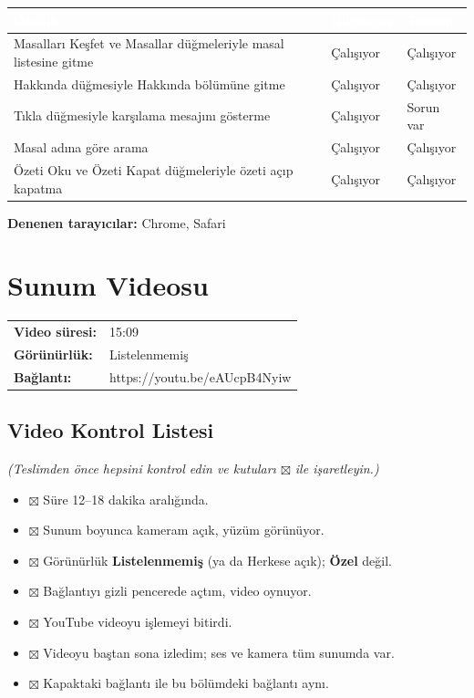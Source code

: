 \documentclass[12pt,a4paper]{article}
\newcommand{\aciklama}[1]{{\color{gray}\itshape (#1)}}
\begin{document}
\begin{center}
\begin{tabular}{@{}p{6cm}p{3.4cm}p{3.4cm}@{}}
\toprule
\rowcolor{ana}\textcolor{white}{\textbf{Özellik}} & \textcolor{white}{\textbf{Bilgisayar}} & \textcolor{white}{\textbf{Telefon}} \\
\midrule
\relax Masalları Keşfet ve Masallar düğmeleriyle masal listesine gitme & Çalışıyor & Çalışıyor \\
\relax Hakkında düğmesiyle Hakkında bölümüne gitme & Çalışıyor & Çalışıyor \\
\relax Tıkla düğmesiyle karşılama mesajını gösterme & Çalışıyor & Sorun var \\
\relax Masal adına göre arama & Çalışıyor & Çalışıyor \\
\relax Özeti Oku ve Özeti Kapat düğmeleriyle özeti açıp kapatma & Çalışıyor & Çalışıyor \\
\bottomrule
\end{tabular}
\end{center}

\textbf{Denenen tarayıcılar:} Chrome, Safari

\section{Sunum Videosu}
\begin{flushleft}
\begin{tabular}{@{}ll@{}}
\textbf{Video süresi:} & 15:09 \quad \\
\textbf{Görünürlük:} & Listelenmemiş \\
\textbf{Bağlantı:} & https://youtu.be/eAUcpB4Nyiw \\
\end{tabular}
\end{flushleft}

\subsection{Video Kontrol Listesi}
\aciklama{Teslimden önce hepsini kontrol edin ve kutuları $\boxtimes$ ile işaretleyin.}
\begin{itemize}
  \item $\boxtimes$ Süre 12--18 dakika aralığında.
  \item $\boxtimes$ Sunum boyunca kameram açık, yüzüm görünüyor.
  \item $\boxtimes$ Görünürlük \textbf{Listelenmemiş} (ya da Herkese açık); \textbf{Özel} değil.
  \item $\boxtimes$ Bağlantıyı gizli pencerede açtım, video oynuyor.
  \item $\boxtimes$ YouTube videoyu işlemeyi bitirdi.
  \item $\boxtimes$ Videoyu baştan sona izledim; ses ve kamera tüm sunumda var.
  \item $\boxtimes$ Kapaktaki bağlantı ile bu bölümdeki bağlantı aynı.
\end{itemize}
\end{document}
